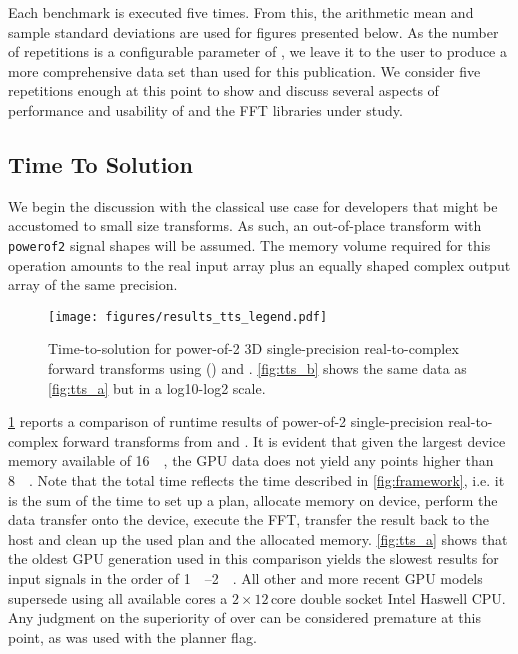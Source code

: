 Each benchmark is executed five times. From this, the arithmetic mean and sample standard deviations are used for figures presented below. As the number of repetitions is a configurable parameter of \gearshifft{}, we leave it to the user to produce a more comprehensive data set than used for this publication. We consider five repetitions enough at this point to show and discuss several aspects of performance and usability of \gearshifft{} and the FFT libraries under study.  

\subsection{Time To Solution}
\label{ssec:tts}

We begin the discussion with the classical use case for developers that might be accustomed to small size transforms. As such, an out-of-place transform with \texttt{powerof2} signal shapes will be assumed. The memory volume required for this operation amounts to the real input array plus an equally shaped complex output array of the same precision.   

\begin{figure}[!htbp]
  \centering
  \texttt{[image: figures/results\_tts\_legend.pdf]}\vspace{-1em}
  \hfill
  \caption{Time-to-solution for power-of-2 3D single-precision real-to-complex forward transforms using \fftw{} () and \cufft{}. \cref{fig:tts_b} shows the same data as \cref{fig:tts_a} but in a log10-log2 scale.}
  \label{fig:tts}
\end{figure}

\cref{fig:tts} reports a comparison of runtime results of power-of-2 single-precision real-to-complex forward transforms from \fftw{} and \cufft{}. It is evident that given the largest device memory available of  \SI{16}{\gibi\byte}, the GPU data does not yield any points higher than \SI{8}{\gibi\byte}. Note that the total time reflects the time described in \cref{fig:framework}, i.e. it is the sum of the time to set up a plan, allocate memory on device, perform the data transfer onto the device, execute the FFT, transfer the result back to the host and clean up the used plan and the allocated memory. \cref{fig:tts_a} shows that the oldest GPU generation used in this comparison yields the slowest results for input signals in the order of \SIrange{1}{2}{\gibi\byte}. All other and more recent GPU models supersede \fftw{} using all available cores a $2\times12\,\text{core}$ double socket Intel Haswell CPU. Any judgment on the superiority of \cufft{} over \fftw{} can be considered premature at this point, as \fftw{} was used with the  planner flag.

